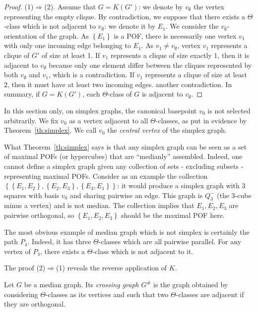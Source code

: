 \documentclass[a4paper,UKenglish,numberwithinsect,cleveref, autoref,anonymous]{lipics-v2021}
\newcommand{\set}[1]{\left\{ #1 \right\}}
\begin{document}
\begin{proof}
(1)$\Rightarrow$(2). Assume that $G=K(G')$: we denote by $v_{\emptyset}$ the vertex representing the empty clique. By contradiction, we suppose that there exists a $\Theta$-class which is not adjacent to $v_{\emptyset}$: we denote it by $E_1$. We consider the $v_{\emptyset}$-orientation of the graph. As $\set{E_1}$ is a POF, there is necessarily one vertex $v_1$ with only one incoming edge belonging to $E_1$. As $v_1 \neq v_{\emptyset}$, vertex $v_1$ represents a clique of $G'$ of size at least 1. If $v_1$ represents a clique of size exactly 1, then it is adjacent to $v_{\emptyset}$ because only one element differ between the cliques represented by both $v_{\emptyset}$ and $v_1$, which is a contradiction. If $v_1$ represents a clique of size at least 2, then it must have at least two incoming edges. another contradiction. In summary, if $G=K(G')$, each $\Theta$-class of $G$ is adjacent to $v_{\emptyset}$.
\end{proof}

In this section only, on simplex graphs, the canonical basepoint $v_0$ is not selected arbitrarily. We fix $v_0$ as a vertex adjacent to all $\Theta$-classes, as put in evidence by Theorem~\ref{th:simplex}. We call $v_0$ the \textit{central vertex} of the simplex graph.

What Theorem~\ref{th:simplex} says is that any simplex graph can be seen as a set of maximal POFs (or hypercubes) that are ``medianly'' assembled. Indeed, one cannot define a simplex graph given any collection of sets - excluding subsets - representing maximal POFs. Consider as an example the collection $\set{\set{E_1,E_2},\set{E_2,E_3},\set{E_3,E_1}}$: it would produce a simplex graph with 3 squares with basis $v_0$ and sharing pairwise an edge. This graph is $Q_3^-$ (the 3-cube minus a vertex) and is not median. The collection implies that $E_1,E_2,E_3$ are pairwise orthogonal, so $\set{E_1,E_2,E_3}$ should be the maximal POF here.

The most obvious example of median graph which is not simplex is certainly the path $P_4$. Indeed, it has three $\Theta$-classes which are all pairwise parallel. For any vertex of $P_4$, there exists a $\Theta$-class which is not adjacent to it.

The proof (2)$\Rightarrow$(1) reveals the reverse application of $K$. 

\begin{definition}
Let $G$ be a median graph. Its \textit{crossing graph} $G^{\#}$ is the graph obtained by considering $\Theta$-classes as its vertices and such that two $\Theta$-classes are adjacent if they are orthogonal.
\label{def:crossing}
\end{definition}
\end{document}
